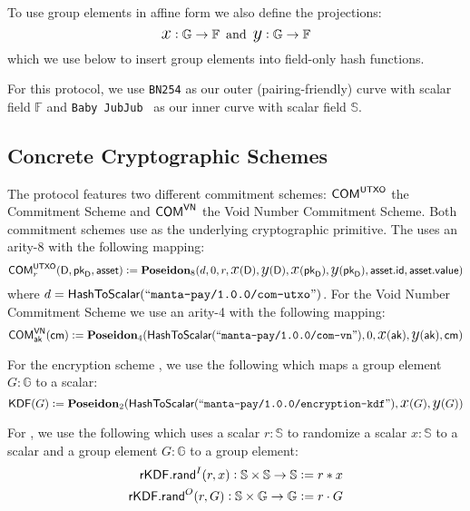 To use group elements in affine form we also define the projections:
\[{\text{\Large $x$}} : \mathbb{G} \to \mathbb{F} \,\,\,\text{and}\,\,\, {\text{\Large $y$}} : \mathbb{G} \to \mathbb{F}\]
which we use below to insert group elements into field-only hash functions.

For this protocol, we use \texttt{BN254} as our outer (pairing-friendly) curve with scalar field $\mathbb{F}$ and \texttt{Baby JubJub}~\cite{eip2494} as our inner curve with scalar field $\mathbb{S}$.

\subsection{Concrete Cryptographic Schemes}

\begin{definition}
    The protocol features two different commitment schemes: ${\textsf{COM}}^{{\textsf{UTXO}}}$ the \UTXO{} Commitment Scheme and ${\textsf{COM}}^{{\textsf{VN}}}$ the Void Number Commitment Scheme. Both commitment schemes use \Poseidon{} as the underlying cryptographic primitive. The \UTXO{} uses an arity-8 \Poseidon{} with the following mapping:
    \[{\textsf{COM}}^{{\textsf{UTXO}}}_r(\textsf{D}, {{\textsf{pk}}_\textsf{D}}, {\textsf{asset}}) := {\textbf{Poseidon}}_8(d, 0, r, {\text{\Large $x$}}(\textsf{D}), {\text{\Large $y$}}(\textsf{D}), {\text{\Large $x$}}({{\textsf{pk}}_\textsf{D}}), {\text{\Large $y$}}({{\textsf{pk}}_\textsf{D}}), {\textsf{asset}}.{\textsf{id}}, {\textsf{asset}}.{\textsf{value}})\]
    where $d = {\textsf{HashToScalar}}({``\texttt{manta-pay/1.0.0/com-utxo}"})$.
    For the Void Number Commitment Scheme we use an arity-4 \Poseidon{} with the following mapping:
    \[{\textsf{COM}}^{{\textsf{VN}}}_{\textsf{ak}}({\textsf{cm}}) := {\textbf{Poseidon}}_4({\textsf{HashToScalar}}({``\texttt{manta-pay/1.0.0/com-vn}"}), 0, {\text{\Large $x$}}({\textsf{ak}}), {\text{\Large $y$}}({\textsf{ak}}), {\textsf{cm}})\]
\end{definition}

\begin{definition}
    For the encryption scheme , we use the following which maps a group element $G : \mathbb{G}$ to a scalar:
    \[{\textsf{KDF}}(G) := {\textbf{Poseidon}}_2({\textsf{HashToScalar}}({``\texttt{manta-pay/1.0.0/encryption-kdf}"}), {\text{\Large $x$}}(G), {\text{\Large $y$}}(G))\]
\end{definition}

\begin{definition}
    For \rKDF, we use the following which uses a scalar $r: \mathbb{S}$ to randomize a scalar $x: \mathbb{S}$ to a scalar 
    and a group element $G : \mathbb{G}$ to a group element:
    \begin{align*}
        {\textsf{rKDF}}.{\textsf{rand}}^I(r, x): \mathbb{S} \times \mathbb{S} \to \mathbb{S} := r * x \\
        {\textsf{rKDF}}.{\textsf{rand}}^O(r, G): \mathbb{S} \times \mathbb{G} \to \mathbb{G} := r \cdot G
    \end{align*}

\end{definition}


